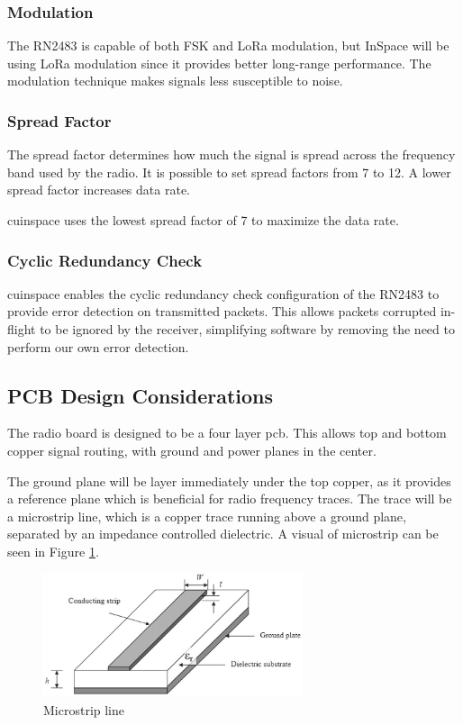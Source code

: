 \subsubsection{Modulation}

The RN2483 is capable of both FSK and LoRa modulation, but InSpace will be using LoRa modulation since it provides
better long-range performance. The modulation technique makes signals less susceptible to noise.

\subsubsection{Spread Factor}

The spread factor determines how much the signal is spread across the frequency band used by the radio. It is possible
to set spread factors from 7 to 12. \cite[Sec. 2.5.5.14]{rn2483-commands} A lower spread factor increases data rate.

\Gls{cuinspace} uses the lowest spread factor of 7 to maximize the data rate.

\subsubsection{Cyclic Redundancy Check}

\Gls{cuinspace} enables the cyclic redundancy check configuration of the RN2483 to provide error detection on
transmitted packets. This allows packets corrupted in-flight to be ignored by the receiver, simplifying software by
removing the need to perform our own error detection.

\subsection{PCB Design Considerations}

The radio board is designed to be a four layer \gls{pcb}. This allows top and bottom copper signal routing, with ground
and power planes in the center.

The ground plane will be layer immediately under the top copper, as it provides a reference plane which is beneficial
for radio frequency traces. The trace will be a microstrip line, which is a copper trace running above a ground plane,
separated by an impedance controlled dielectric. A visual of microstrip can be seen in Figure \ref{fig:microstrip}.

\begin{figure}[H]
    \centering
    \includegraphics[width=3in]{assets/images/microstrip.png}
    \caption{Microstrip line \cite{microstrip}}
    \label{fig:microstrip}
\end{figure}

